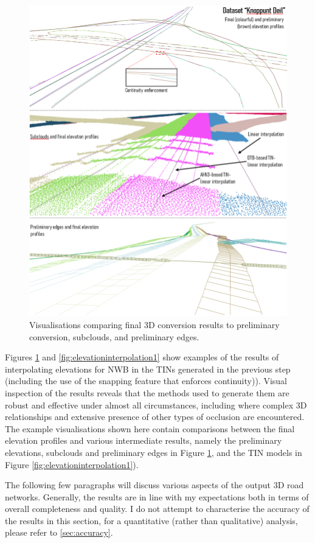\begin{figure}[]
    \centering
    \includegraphics[width=0.9\linewidth]{final_report/figs/elevationinterpolation0.png}
    \caption{Visualisations comparing final 3D conversion results to preliminary conversion, subclouds, and preliminary edges.}
    \label{fig:elevationinterpolation0}
\end{figure}

Figures \ref{fig:elevationinterpolation0} and \ref{fig:elevationinterpolation1} show examples of the results of interpolating elevations for NWB in the TINs generated in the previous step (including the use of the snapping feature that enforces continuity)). Visual inspection of the results reveals that the methods used to generate them are robust and effective under almost all circumstances, including where complex 3D relationships and extensive presence of other types of occlusion are encountered. The example visualisations shown here contain comparisons between the final elevation profiles and various intermediate results, namely the preliminary elevations, subclouds and preliminary edges in Figure \ref{fig:elevationinterpolation0}, and the TIN models in Figure \ref{fig:elevationinterpolation1}).

The following few paragraphs will discuss various aspects of the output 3D road networks. Generally, the results are in line with my expectations both in terms of overall completeness and quality. I do not attempt to characterise the accuracy of the results in this section, for a quantitative (rather than qualitative) analysis, please refer to \ref{sec:accuracy}.

